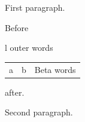 \documentclass{article}
\begin{document}
First paragraph.

Before \begin{tabular}{l} outer words \begin{tabular}{lll} a & b & Beta words \lxmbf\end{tabular}\end{tabular} after.

Second paragraph.
\end{document}
